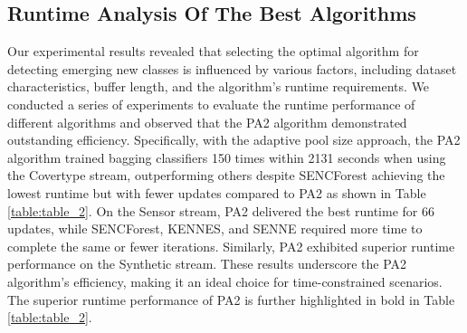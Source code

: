\subsection{Runtime Analysis Of The Best Algorithms}
\label{sec:running}
Our experimental results revealed that selecting the optimal algorithm for detecting emerging new classes is influenced by various factors, including dataset characteristics, buffer length, and the algorithm's runtime requirements. We conducted a series of experiments to evaluate the runtime performance of different algorithms and observed that the PA2 algorithm demonstrated outstanding efficiency. Specifically, with the adaptive pool size approach, the PA2 algorithm trained bagging classifiers 150 times within 2131 seconds when using the Covertype stream, outperforming others despite SENCForest achieving the lowest runtime but with fewer updates compared to PA2 as shown in Table \ref{table:table_2}. On the Sensor stream, PA2 delivered the best runtime for 66 updates, while SENCForest, KENNES, and SENNE required more time to complete the same or fewer iterations. Similarly, PA2 exhibited superior runtime performance on the Synthetic stream. These results underscore the PA2 algorithm’s efficiency, making it an ideal choice for time-constrained scenarios. The superior runtime performance of PA2 is further highlighted in bold in Table \ref{table:table_2}.
	
